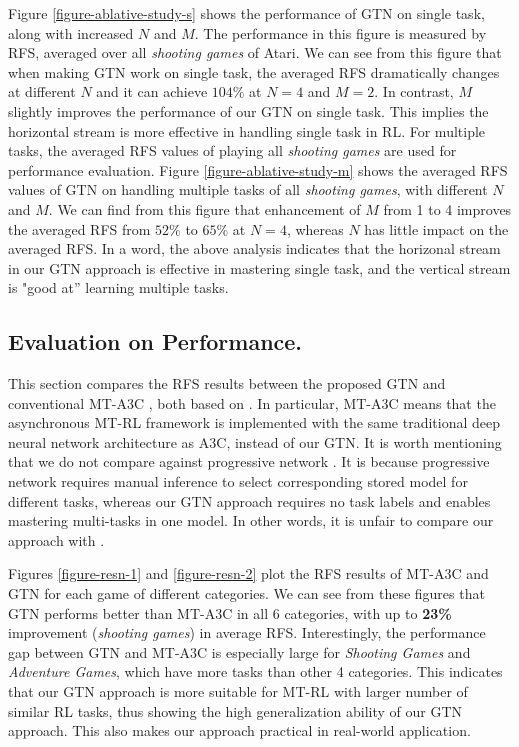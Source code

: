 \documentclass[letterpaper]{article} %
\begin{document}
Figure \ref{figure-ablative-study-s} shows the performance of GTN on single task, along with increased $N$ and $M$.
The performance in this figure is measured by RFS, averaged over all \textit{shooting games} of Atari.
We can see from this figure that when making GTN work on single task, the averaged RFS dramatically changes at different $N$ and it can achieve $104\%$ at $N=4$ and $M=2$.
In contrast, $M$ slightly improves the performance of our GTN on single task.
This implies the horizontal stream is more effective in handling single task in RL.
For multiple tasks, the averaged RFS values of playing all \textit{shooting games} are used for performance evaluation.
Figure \ref{figure-ablative-study-m} shows the averaged RFS values of GTN on handling multiple tasks of all \textit{shooting games}, with different $N$ and $M$.
We can find from this figure that enhancement of $M$ from 1 to 4 improves the averaged RFS from $52\%$ to $65\%$ at $N=4$, whereas $N$ has little impact on the averaged RFS.
In a word, the above analysis indicates that the horizonal stream in our GTN approach is effective in mastering single task, and the vertical stream is "good at'' learning multiple tasks.



\subsection{Evaluation on Performance.}


This section compares the RFS results between the proposed GTN and conventional MT-A3C \cite{romoff2016deep}, both based on \cite{mnih2016asynchronous}. In particular, MT-A3C means that the asynchronous MT-RL framework is implemented with the same traditional deep neural network architecture as A3C, instead of our GTN.
It is worth mentioning that we do not compare against progressive network \cite{rusu2016progressive}. It is because progressive network \cite{rusu2016progressive} requires manual inference to select corresponding stored model for different tasks, whereas our GTN approach requires no task labels and enables mastering multi-tasks in one model. In other words, it is unfair to compare our approach with \cite{rusu2016progressive}.

Figures \ref{figure-resn-1} and \ref{figure-resn-2} plot the RFS results of MT-A3C and GTN for each game of different categories.
We can see from these figures that GTN performs better than MT-A3C in all 6 categories, with up to \textbf{23\%} improvement (\textit{shooting games}) in average RFS.
Interestingly, the performance gap between GTN and MT-A3C is especially large for \textit{Shooting Games} and \textit{Adventure Games}, which have more tasks than other 4 categories.
This indicates that our GTN approach is more suitable for MT-RL with larger number of similar RL tasks, thus showing the high generalization ability of our GTN approach.
This also makes our approach practical in real-world application.
\end{document}
